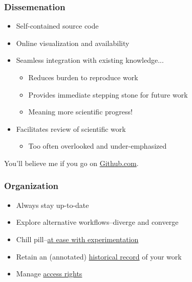\begin{frame}
    \frametitle{Dissemenation}
    \begin{itemize}
        \item Self-contained source code
        \item Online visualization and availability
        \item Seamless integration with existing knowledge...
        \begin{itemize}
            \item Reduces burden to reproduce work
            \item Provides immediate stepping stone for future work
            \item Meaning more scientific progress!
        \end{itemize}
        \item Facilitates review of scientific work
        \begin{itemize}
            \item Too often overlooked and under-emphasized
        \end{itemize}
    \end{itemize}
    You'll believe me if you go on \href{https://github.com/}{Github.com}.
\end{frame}

\begin{frame}\frametitle{Organization}
    \begin{itemize}
        \item Always stay up-to-date
        \item Explore alternative workflows--diverge and converge
        \item Chill pill--\href{http://git-scm.com/book/en/Git-Branching}{at ease with experimentation}
        \item Retain an (annotated) \href{http://git-scm.com/book/en/Git-Basics-Viewing-the-Commit-History}{historical record} of your work
        \item Manage \href{http://git-scm.com/book/en/Git-Internals-Transfer-Protocols}{access rights}
    \end{itemize}
\end{frame}

